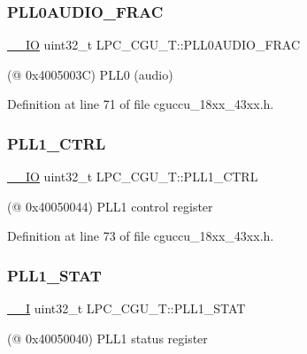 \subsubsection{\texorpdfstring{P\+L\+L0\+A\+U\+D\+I\+O\+\_\+\+F\+R\+AC}{PLL0AUDIO\_FRAC}}
{\footnotesize\ttfamily \hyperlink{core__sc300_8h_aec43007d9998a0a0e01faede4133d6be}{\+\_\+\+\_\+\+IO} uint32\+\_\+t L\+P\+C\+\_\+\+C\+G\+U\+\_\+\+T\+::\+P\+L\+L0\+A\+U\+D\+I\+O\+\_\+\+F\+R\+AC}

(@ 0x4005003C) P\+L\+L0 (audio) 

Definition at line 71 of file cguccu\+\_\+18xx\+\_\+43xx.\+h.

\mbox{\label{struct_l_p_c___c_g_u___t_a4c83b408f51945f396e049b8417d2787}} 
\subsubsection{\texorpdfstring{P\+L\+L1\+\_\+\+C\+T\+RL}{PLL1\_CTRL}}
{\footnotesize\ttfamily \hyperlink{core__sc300_8h_aec43007d9998a0a0e01faede4133d6be}{\+\_\+\+\_\+\+IO} uint32\+\_\+t L\+P\+C\+\_\+\+C\+G\+U\+\_\+\+T\+::\+P\+L\+L1\+\_\+\+C\+T\+RL}

(@ 0x40050044) P\+L\+L1 control register 

Definition at line 73 of file cguccu\+\_\+18xx\+\_\+43xx.\+h.

\mbox{\label{struct_l_p_c___c_g_u___t_a1c60675e0c0d4b7ff16e9280f4d53875}} 
\subsubsection{\texorpdfstring{P\+L\+L1\+\_\+\+S\+T\+AT}{PLL1\_STAT}}
{\footnotesize\ttfamily \hyperlink{core__sc300_8h_af63697ed9952cc71e1225efe205f6cd3}{\+\_\+\+\_\+I} uint32\+\_\+t L\+P\+C\+\_\+\+C\+G\+U\+\_\+\+T\+::\+P\+L\+L1\+\_\+\+S\+T\+AT}

(@ 0x40050040) P\+L\+L1 status register 

